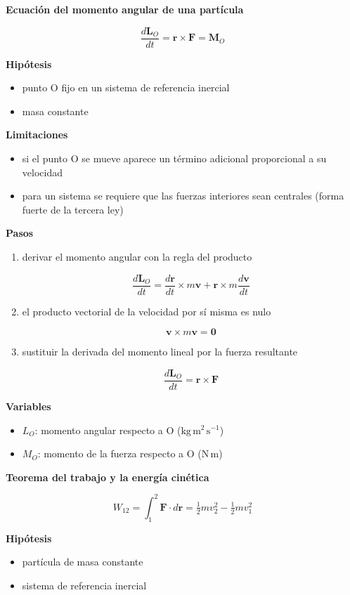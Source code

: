 \documentclass[10pt,openany]{book}
\begin{document}
\begin{tcolorbox}[title={Desarrollos del modelo}, studiumdef, breakable]
\noindent\textbf{Ecuación del momento angular de una partícula}

\[
\frac{d\mathbf{L}_O}{dt} = \mathbf{r}\times\mathbf{F} = \mathbf{M}_O
\]

\noindent\textbf{Hipótesis}
\begin{itemize}
\item punto O fijo en un sistema de referencia inercial
\item masa constante
\end{itemize}

\noindent\textbf{Limitaciones}
\begin{itemize}
\item si el punto O se mueve aparece un término adicional proporcional a su velocidad
\item para un sistema se requiere que las fuerzas interiores sean centrales (forma fuerte de la tercera ley)
\end{itemize}

\noindent\textbf{Pasos}
\begin{enumerate}
\item
derivar el momento angular con la regla del producto

\[
\frac{d\mathbf{L}_O}{dt} = \frac{d\mathbf{r}}{dt}\times m\mathbf{v} + \mathbf{r}\times m\frac{d\mathbf{v}}{dt}
\]
\item
el producto vectorial de la velocidad por sí misma es nulo

\[
\mathbf{v}\times m\mathbf{v} = \mathbf{0}
\]
\item
sustituir la derivada del momento lineal por la fuerza resultante

\[
\frac{d\mathbf{L}_O}{dt} = \mathbf{r}\times\mathbf{F}
\]
\end{enumerate}

\noindent\textbf{Variables}
\begin{itemize}
\item $L_{O}$: momento angular respecto a O ($\mathrm{kg}\,\mathrm{m}^{2}\,\mathrm{s}^{-1}$)
\item $M_{O}$: momento de la fuerza respecto a O ($\mathrm{N}\,\mathrm{m}$)
\end{itemize}



\noindent\textbf{Teorema del trabajo y la energía cinética}

\[
W_{12} = \int_{1}^{2}\mathbf{F}\cdot d\mathbf{r} = \tfrac{1}{2}m v_2^{2} - \tfrac{1}{2}m v_1^{2}
\]

\noindent\textbf{Hipótesis}
\begin{itemize}
\item partícula de masa constante
\item sistema de referencia inercial
\end{itemize}


\end{tcolorbox}
\end{document}
